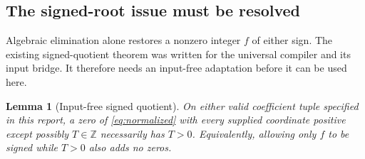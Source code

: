 \documentclass[11pt,a4paper]{article}
\newtheorem{lemma}[theorem]{Lemma}
\theoremstyle{remark}\newtheorem{remark}[theorem]{Remark}
\newcommand{\Z}{\mathbb Z}
\begin{document}
\subsection{The signed-root issue must be resolved}
Algebraic elimination alone restores a nonzero integer \(f\) of either
sign. The existing signed-quotient theorem was written for the universal
compiler and its input bridge. It therefore needs an input-free
adaptation before it can be used here.

\begin{lemma}[Input-free signed quotient]\label{lem:signed}
On either valid coefficient tuple specified in this report, a zero of
\eqref{eq:normalized} with every supplied coordinate positive except
possibly \(T\in\Z\) necessarily has \(T>0\). Equivalently, allowing
only \(f\) to be signed while \(T>0\) also adds no zeros.
\end{lemma}
\end{document}
